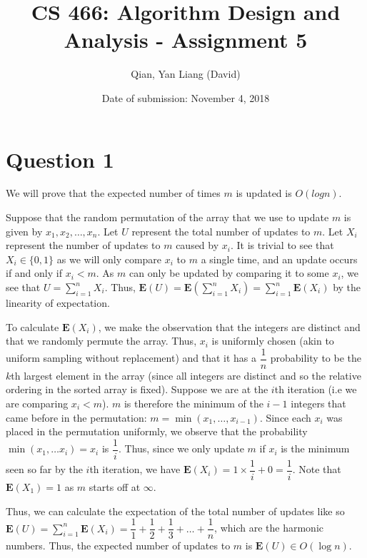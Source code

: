 \documentclass{article}
\title{CS 466: Algorithm Design and Analysis - Assignment 5}
\author{Qian, Yan Liang (David)}
\date{Date of submission: November 4, 2018}
\begin{document}
\newpage

\section{Question 1}

We will prove that the expected number of times $m$ is updated is $O(logn)$.

Suppose that the random permutation of the array that we use to update $m$ is given by $x_1, x_2, \ldots, x_n$. Let $U$
represent the total number of updates to $m$. Let $X_i$ represent the number of updates to $m$ caused by $x_i$. It is
trivial to see that $X_i \in \{0, 1\}$ as we will only compare $x_i$ to $m$ a single time, and an update occurs if and only if
$x_i < m$. As $m$ can only be updated by comparing it to some $x_i$, we see that $U = \sum_{i=1}^n X_i$. Thus,
$\textbf{E}(U) = \textbf{E}(\sum_{i=1}^n X_i) = \sum_{i=1}^n \textbf{E}(X_i)$ by the linearity of expectation.

To calculate $\textbf{E}(X_i)$, we make the observation that the integers are distinct and that we randomly permute the
array. Thus, $x_i$ is uniformly chosen (akin to uniform sampling without replacement) and that it has a $\dfrac{1}{n}$
probability to be the $k$th largest element in the array (since all integers are distinct and so the relative ordering
in the sorted array is fixed). Suppose we are at the $i$th iteration (i.e we are comparing $x_i < m$). $m$ is therefore
the minimum of the $i-1$ integers that came before in the permutation: $m = \min(x_1, \ldots, x_{i-1})$.  Since each
$x_i$ was placed in the permutation uniformly, we observe that the probability $\min(x_1, \ldots x_i) = x_i$ is
$\dfrac{1}{i}$. Thus, since we only update $m$ if $x_i$ is the minimum seen so far by the $i$th iteration, we have
$\textbf{E}(X_i) = 1 \times \dfrac{1}{i} + 0 = \dfrac{1}{i}$. Note that $\textbf{E}(X_1) = 1$ as $m$ starts off at
$\infty$.

Thus, we can calculate the expectation of the total number of updates like so $\textbf{E}(U) = \sum_{i=1}^n
\textbf{E}(X_i) = \dfrac{1}{1} + \dfrac{1}{2} + \dfrac{1}{3} + \ldots + \dfrac{1}{n}$, which are the harmonic
numbers. Thus, the expected number of updates to $m$ is $\textbf{E}(U) \in O(\log n)$.
\end{document}
